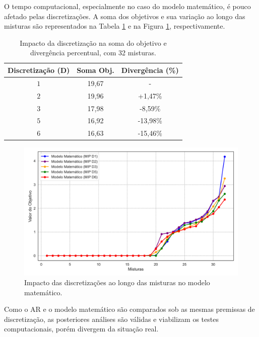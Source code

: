 \documentclass[
    12pt,                %
    openright,           %
    oneside,             %
    a4paper,             %
    english,             %
    spanish,             %
    brazil               %
]{ufscar}
\begin{document}
O tempo computacional, especialmente no caso do modelo matemático, é pouco afetado pelas discretizações. A soma dos objetivos e sua variação ao longo das misturas são representados na Tabela \ref{tab:discretizacao_divergencia} e na Figura \ref{figure:DiscMM}, respectivamente.

\begin{table}[htp]
    \centering
    \caption{Impacto da discretização na soma do objetivo e divergência percentual, com 32 misturas.}
    \begin{tabular}{c c c}
         Discretização (D) & Soma Obj. & Divergência (\%) \\
         \hline
         \(1\)   & 19,67  & - \\
         \(2\)   & 19,96  & +1,47\% \\
         \(3\)   & 17,98  & -8,59\% \\
         \(5\)   & 16,92  & -13,98\% \\
         \(6\)   & 16,63  & -15,46\% \\
         \hline
    \end{tabular}
    \label{tab:discretizacao_divergencia}
\end{table}

\begin{figure}[hbt]
\centering
  \caption{Impacto das discretizações ao longo das misturas no modelo matemático.}   
  \label{figure:DiscMM}
  \includegraphics[width=1\textwidth]{figures/Discretizacao_comparacao.png}
\end{figure}

Como o AR e o modelo matemático são comparados sob as mesmas premissas de discretização, as posteriores análises são válidas e viabilizam os testes computacionais, porém divergem da situação real.
\end{document}
